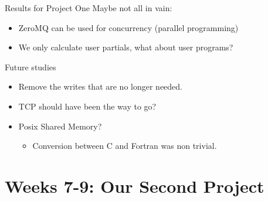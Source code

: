 \documentclass{beamer}
\begin{document}
    \begin{frame}{Results for Project One}
        Maybe not all in vain:
        \pause
        \begin{itemize}[<+-|alert@+>]
            \item ZeroMQ can be used for concurrency (parallel programming)
            \item We only calculate user partials, what about user programs?
        \end{itemize}
    \end{frame}
    \begin{frame}{Future studies}
        \begin{itemize}[<+-|alert@+>]
            \item Remove the writes that are no longer needed.
            \item TCP should have been the way to go?
            \item Posix Shared Memory?
            \begin{itemize}[<+-|alert@+>]
                \item Conversion between C and Fortran was non trivial.
            \end{itemize}
        \end{itemize}
    \end{frame}


    \section{Weeks 7-9: Our Second Project}
\end{document}
